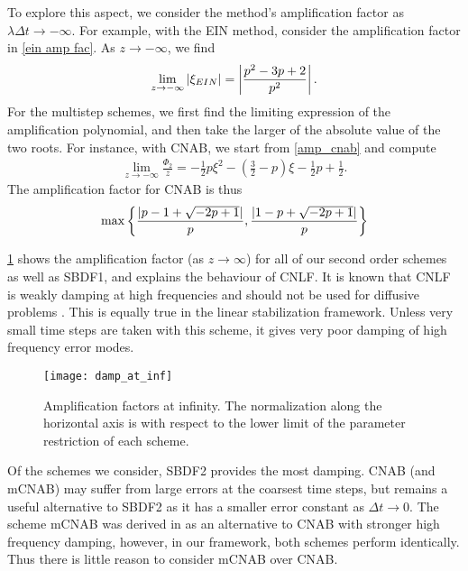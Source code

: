 To explore this aspect, we consider the method's amplification factor as $\lambda\Delta t \to -\infty$. For example, with the EIN method, consider the amplification factor in \cref{ein amp fac}. As $z\to -\infty$, we find 
\begin{align}
        \lim_{z\to-\infty} \left|\xi_{EIN}\right| = \left|\frac{p^2-3p+2}{p^2}\right|.
\end{align}
For the multistep schemes, we first find the limiting expression of the amplification polynomial, and then take the larger of the absolute value of the two roots. For instance, with CNAB, we start from \cref{amp_cnab} and compute
\begin{align}
        \lim_{z\to-\infty} \frac{\Phi_2}{z}
= -\frac{1}{2}p\xi^2-\left(\frac{3}{2}-p\right)\xi-\frac{1}{2}p+\frac{1}{2}.
\end{align}
The amplification factor for CNAB is thus 
\begin{align}
\max\left\{ \frac{\left|p-1+\sqrt{-2p+1}\right|}{p}, \frac{\left|1-p+\sqrt{-2p+1}\right|}{p}\right\}
\end{align}

\cref{fig:damp fac at inf} shows the amplification factor (as $z\to\infty$) for all of our second order schemes as well as SBDF1, and explains the behaviour of CNLF. It is known that CNLF is weakly damping at high frequencies and should not be used for diffusive problems \cite{ascher1995implicit}. This is equally true in the linear stabilization framework. Unless very small time steps are taken with this scheme, it gives very poor damping of high frequency error modes.

\begin{figure}[htb!]
	\centering 
\texttt{[image: damp\_at\_inf]}
\caption[Amplification factors at infinity.]{Amplification factors at infinity. The normalization along the horizontal axis is with respect to the lower limit of the parameter restriction of each scheme.}
\label{fig:damp fac at inf}
\end{figure}

Of the schemes we consider, SBDF2 provides the most damping. CNAB (and mCNAB) may suffer from large errors at the coarsest time steps, but remains a useful alternative to SBDF2 as it has a smaller error constant as $\Delta t\to 0$. The scheme mCNAB was derived in \cite{ascher1995implicit} as an alternative to CNAB with stronger high frequency damping, however, in our framework, both schemes perform identically. Thus there is little reason to consider mCNAB over CNAB.

